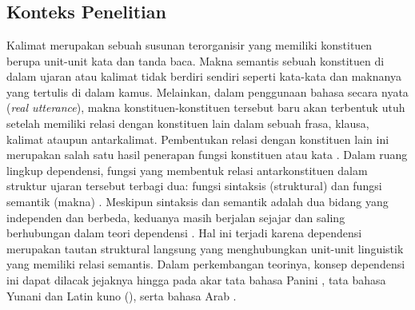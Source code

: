 \chapter{\babDua}

\section{Konteks Penelitian}
Kalimat merupakan sebuah susunan terorganisir yang memiliki konstituen berupa unit-unit kata dan tanda baca. Makna semantis sebuah konstituen di dalam ujaran atau kalimat tidak berdiri sendiri seperti kata-kata dan maknanya yang tertulis di dalam kamus. Melainkan, dalam penggunaan bahasa secara nyata (\textit{real utterance}), makna konstituen-konstituen tersebut baru akan terbentuk utuh setelah memiliki relasi dengan konstituen lain dalam sebuah frasa, klausa, kalimat ataupun antarkalimat. Pembentukan relasi dengan konstituen lain ini merupakan salah satu hasil penerapan fungsi konstituen atau kata \citep{tesniere1959elements}. Dalam ruang lingkup dependensi, fungsi yang membentuk relasi antarkonstituen dalam struktur ujaran tersebut terbagi dua: fungsi sintaksis (struktural) dan fungsi semantik (makna) \citep{tesniere1959elements}. Meskipun sintaksis dan semantik adalah dua bidang yang independen dan berbeda, keduanya masih berjalan sejajar dan saling berhubungan dalam teori dependensi \citep{tesniere1959elements}. Hal ini terjadi karena dependensi merupakan tautan struktural langsung yang menghubungkan unit-unit linguistik yang memiliki relasi semantis. Dalam perkembangan teorinya, konsep dependensi ini dapat dilacak jejaknya hingga pada akar tata bahasa Panini \citep{bharati1995natural}, tata bahasa Yunani dan Latin kuno (\citealp{covington1984syntactic, percival1990reflections}), serta bahasa Arab \citep{owens1988foundations}. 

